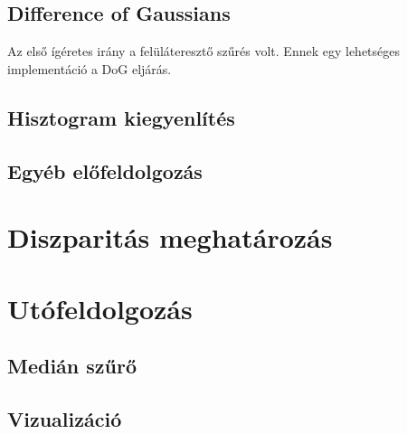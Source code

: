 \subsection{Difference of Gaussians}\label{sect:DoG}

Az első ígéretes irány a felüláteresztő szűrés volt.
Ennek egy lehetséges implementáció a DoG eljárás.

\subsection{Hisztogram kiegyenlítés}\label{sect:histNorm}

\subsection{Egyéb előfeldolgozás}\label{sect:scale}


\section{Diszparitás meghatározás}\label{sect:Depthproc}

\section{Utófeldolgozás}\label{sect:Postproc}


\subsection{Medián szűrő}\label{sect:median}


\subsection{Vizualizáció}\label{sect:visual}

